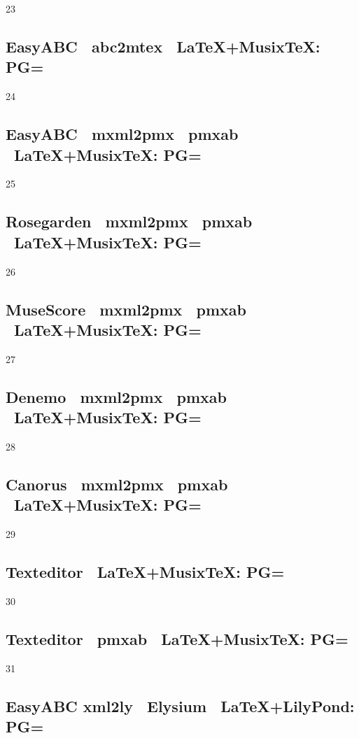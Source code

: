 23

\subsection{EasyABC \ra\ abc2mtex \ra\ \LaTeX+Musix\TeX: PG=} 

24

\subsection{EasyABC \ra\ mxml2pmx \ra\ pmxab \ra\ \LaTeX+Musix\TeX: PG=} 

25

\subsection{Rosegarden \ra\ mxml2pmx \ra\ pmxab \ra\ \LaTeX+Musix\TeX: PG=}

26

\subsection{MuseScore \ra\ mxml2pmx \ra\ pmxab \ra\ \LaTeX+Musix\TeX: PG=}

27

\subsection{Denemo \ra\ mxml2pmx \ra\ pmxab \ra\ \LaTeX+Musix\TeX: PG=} 

28

\subsection{Canorus \ra\ mxml2pmx \ra\ pmxab \ra\ \LaTeX+Musix\TeX: PG=} 

29

\subsection{Texteditor \ra\ \LaTeX+Musix\TeX: PG=}

30

\subsection{Texteditor \ra\ pmxab \ra\ \LaTeX+Musix\TeX: PG=}

31

\subsection{Easy\-ABC \ra xml2ly \ra\ Elysium \ra\ \LaTeX+LilyPond: PG=} 

